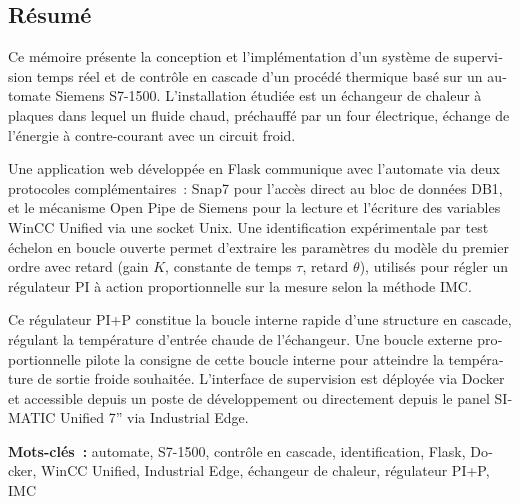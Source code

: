 \begin{otherlanguage}{french}
\chapter*{Résumé}

\noindent
Ce mémoire présente la conception et l'implémentation d'un système de supervision temps réel
et de contrôle en cascade d'un procédé thermique basé sur un automate Siemens S7-1500.
L'installation étudiée est un échangeur de chaleur à plaques dans lequel un fluide chaud,
préchauffé par un four électrique, échange de l'énergie à contre-courant avec un circuit
froid.

Une application web développée en Flask communique avec l'automate via deux protocoles
complémentaires~: Snap7 pour l'accès direct au bloc de données DB1, et le mécanisme Open
Pipe de Siemens pour la lecture et l'écriture des variables WinCC Unified via une socket Unix.
Une identification expérimentale par test échelon en boucle ouverte permet d'extraire les
paramètres du modèle du premier ordre avec retard (gain $K$, constante de temps $\tau$,
retard $\theta$), utilisés pour régler un régulateur PI à action proportionnelle sur la mesure
selon la méthode IMC.

Ce régulateur PI+P constitue la boucle interne rapide d'une structure en cascade, régulant
la température d'entrée chaude de l'échangeur. Une boucle externe proportionnelle pilote
la consigne de cette boucle interne pour atteindre la température de sortie froide souhaitée.
L'interface de supervision est déployée via Docker et accessible depuis un poste de
développement ou directement depuis le panel SIMATIC Unified 7'' via Industrial Edge.

\medskip
\noindent\textbf{Mots-clés~:} automate, S7-1500, contrôle en cascade, identification,
Flask, Docker, WinCC Unified, Industrial Edge, échangeur de chaleur, régulateur PI+P, IMC
\end{otherlanguage}
